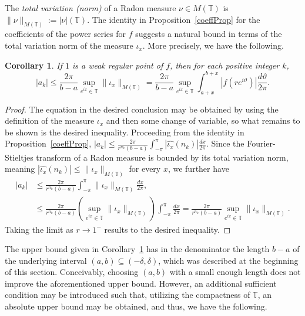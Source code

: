 \documentclass[11pt,a4paper]{article}
\newcommand{\T}{\mathbb{T}}
\def\sub{\subseteq}
\def\sub{\subseteq}
\newtheorem{corollary}[theorem]{Corollary}
\begin{document}
The \emph{total variation (norm)} of a Radon measure $\nu\in M(\T)$ is $\|\nu\|_{M(\T)}:=|\nu|(\T)$. The identity in Proposition~\ref{coeffProp} for the coefficients of the power series for $f$ suggests a natural bound in terms of the total variation norm of the measure $\iota_x$. More precisely, we have the following.

\begin{corollary}\label{CoeffCor}
If $1$ is a weak regular point of $f$, then for each positive integer $k$,
\[
|a_k| \le \frac{2\pi}{b-a} \sup_{e^{ix}\in\T} \|\iota_x\|_{M(\mathbb{T})}=\frac{2\pi}{b-a} \sup_{e^{ix}\in\T}\int_{a+x}^{b+x}|f(re^{i\vartheta})|\frac{d\vartheta}{2\pi}.
\]
\end{corollary}

\begin{proof} The equation in the desired conclusion may be obtained by using the definition of the measure $\iota_x$ and then some change of variable, so what remains to be shown is the desired inequality. Proceeding from the identity in Proposition~\ref{coeffProp}, $|a_k| \le \frac{2\pi}{r^{n_k}(b-a)} \int_{-\pi}^\pi \left| \widehat{\iota_x}(n_k) \right| \frac{dx}{2\pi}$.
Since the Fourier-Stieltjes transform of a Radon measure is bounded by its total variation norm, meaning $\left|\widehat{\iota_x}(n_k)\right| \le \|\iota_x\|_{M(\T)}$ for every $x$, we further have
\begin{align*}
|a_k| &\le \frac{2\pi}{r^{n_k}(b-a)} \int_{-\pi}^\pi \|\iota_x\|_{M(\T)} \frac{dx}{2\pi}, \\
&\le \frac{2\pi}{r^{n_k}(b-a)} \left( \sup_{e^{ix}\in\T} \|\iota_x\|_{M(\T)} \right) \int_{-\pi}^\pi \frac{dx}{2\pi}= \frac{2\pi}{r^{n_k}(b-a)} \sup_{e^{ix}\in\T} \|\iota_x\|_{M(\T)}.
\end{align*}
Taking the limit as $r \to 1^-$ results to the desired inequality.
\end{proof}

The upper bound given in Corollary~\ref{CoeffCor} has in the denominator the length $b-a$ of the underlying interval $(a,b)\sub(-\delta,\delta)$, which was described at the beginning of this section. Conceivably, choosing $(a,b)$ with a small enough length does not improve the aforementioned upper bound. However, an additional sufficient condition may be introduced such that, utilizing the compactness of $\T$, an absolute upper bound may be obtained, and thus, we have the following.
\end{document}
